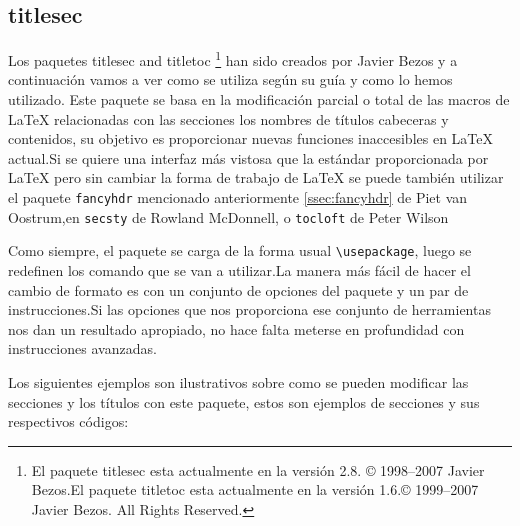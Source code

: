 
		


	\subsection{titlesec}\label{ssec:titlsec}

	Los paquetes \textsf{titlesec} and \textsf{titletoc} \footnote{El paquete \textsf{titlesec} esta actualmente en la versión 2.8.  \copyright{} 1998--2007 Javier Bezos.El paquete \textsf{titletoc} esta actualmente en la versión 1.6.\copyright{} 1999--2007 Javier Bezos.  All Rights Reserved.} han sido creados por Javier Bezos y a continuación vamos a ver como se utiliza según su guía \cite{guiatitlesec} y como lo hemos utilizado.
	Este paquete se basa en la modificación parcial o total de las macros de \LaTeX {} relacionadas con las secciones los nombres de títulos cabeceras y contenidos, su objetivo es proporcionar nuevas funciones inaccesibles en \LaTeX{} actual.Si se quiere una interfaz más vistosa que la estándar proporcionada por \LaTeX{} pero sin cambiar la forma de trabajo de \LaTeX{} se puede también utilizar el paquete \verb|fancyhdr| mencionado anteriormente \ref{ssec:fancyhdr} de Piet van Oostrum,en \verb|secsty| de Rowland McDonnell, o \verb|tocloft| de Peter Wilson 

	Como siempre, el paquete se carga de la forma usual \verb|\usepackage|, luego se redefinen los comando que se van a utilizar.La manera más fácil de hacer el cambio de formato es con un conjunto de opciones del paquete y un par de instrucciones.Si las opciones que nos proporciona ese conjunto de herramientas nos dan un resultado apropiado, no hace falta meterse en profundidad con instrucciones avanzadas.

	Los siguientes ejemplos son ilustrativos sobre como se pueden modificar las secciones y los títulos con este paquete, estos son ejemplos de secciones y sus respectivos códigos:

	
	\begingroup

	\setlength{\parskip}{0pt}

	\examplesep
	  \setcounter{section}{3}
	\titleformat{\section}[block]
  	{\normalfont\bfseries\filcenter}{\fbox{\itshape\thesection}}{1em}{}

